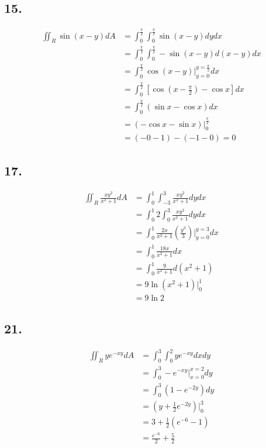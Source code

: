 \documentclass{article}
\begin{document}
  \subsection*{15. }

  $$\begin{aligned}
    \iint_R \sin(x-y) dA &= \int_0^{\frac \pi 2} \int_0^{\frac \pi 2} \sin(x - y) dy dx \\
    &= \int_0^{\frac \pi 2} \int_0^{\frac \pi 2} -\sin(x - y) d(x - y) dx \\
    &= \int_0^{\frac \pi 2} \cos(x - y)\biggl|_{y = 0}^{y = \frac \pi 2} dx \\
    &= \int_0^{\frac \pi 2} [\cos(x - \frac \pi 2) - \cos x] dx \\
    &= \int_0^{\frac \pi 2} (\sin x - \cos x) dx \\
    &= (-\cos x - \sin x)\biggl|_0^{\frac \pi 2} \\
    &= (-0-1) - (-1-0) = 0
  \end{aligned}$$

  \subsection*{17. }

  $$\begin{aligned}
    \iint_R \frac{xy^2}{x^2+1} dA &= \int_0^1 \int_{-3}^3 \frac{xy^2}{x^2+1} dy dx \\
    &= \int_0^1 2 \int_0^3 \frac{xy^2}{x^2+1} dy dx \\
    &= \int_0^1 \frac{2x}{x^2+1} (\frac{y^3}{3})\biggl|_{y=0}^{y=3} dx \\
    &= \int_0^1 \frac{18x}{x^2+1} dx \\
    &= \int_0^1 \frac{9}{x^2+1} d(x^2+1) \\
    &= 9 \ln (x^2 + 1) \biggl|_0^1 \\
    &= 9\ln 2
  \end{aligned}$$

  \subsection*{21. }

  $$\begin{aligned}
    \iint_R ye^{-xy} dA &= \int_0^3 \int_0^2 ye^{-xy} dx dy \\
    &= \int_0^3 -e^{-xy}\biggl|_{x=0}^{x=2} dy \\
    &= \int_0^3 (1 - e^{-2y}) dy \\
    &= (y + \frac 1 2 e^{-2y})\biggl|_0^3 \\
    &= 3 + \frac 1 2 (e^{-6} - 1) \\
    &= \frac{e^{-6}}{2} + \frac{5}{2}
  \end{aligned}$$
\end{document}

